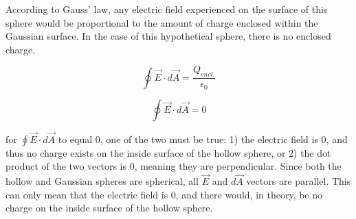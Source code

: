 According to Gauss' law, any electric field experienced on the surface of this sphere would be proportional to the amount of charge enclosed within the Gaussian surface. In the case of this hypothetical sphere, there is no enclosed charge. 

$$\oint \vec{E} \cdot d\vec{A} = \frac{Q_{encl.}}{\epsilon_{0}}$$

$$\oint \vec{E} \cdot d\vec{A} = 0$$

for $\oint \vec{E} \cdot d\vec{A}$ to equal $0$, one of the two must be true:
1) the electric field is 0, and thus no charge exists on the inside surface of the hollow sphere, or
2) the dot product of the two vectors is $0$, meaning they are perpendicular.
Since both the hollow and Gaussian spheres are spherical, all $\vec{E}$ and $d\vec{A}$ vectors are parallel. This can only mean that the electric field is 0, and there would, in theory, be no charge on the inside surface of the hollow sphere.

\newpage
